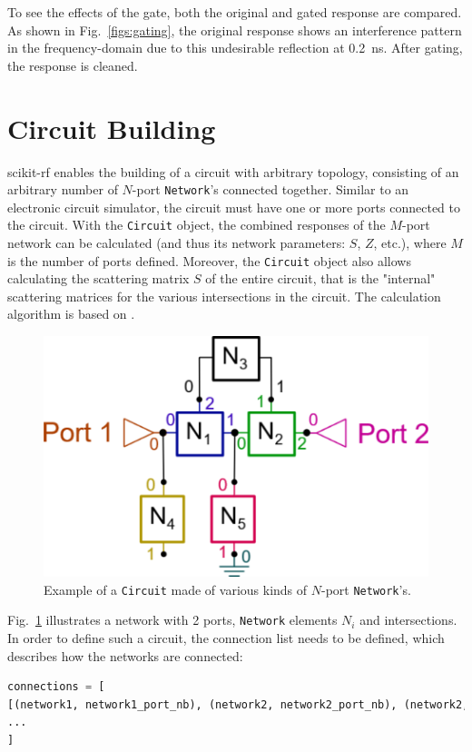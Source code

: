 \documentclass[10pt, letterpaper]{scrartcl}
\newcommand{\skrf}{{s}cikit-rf\xspace}
\begin{document}
To see the effects of the gate, both the original and gated response are compared. As shown in Fig.~\ref{figs:gating}, the original response shows an interference pattern in the frequency-domain due to this undesirable reflection at \SI{0.2}{\nano\second}. After gating, the response is cleaned.


\section{Circuit Building}
\skrf{} enables the building of a circuit with arbitrary topology, consisting of an arbitrary number of $N$-port \texttt{Network}'s connected together. Similar to an electronic circuit simulator, the circuit must have one or more ports connected to the circuit. With the \texttt{Circuit} object, the combined responses of the $M$-port network can be calculated (and thus its network parameters: $S$, $Z$, etc.), where $M$ is the number of ports defined. Moreover, the \texttt{Circuit} object also allows calculating the scattering matrix $S$ of the entire circuit, that is the "internal" scattering matrices for the various intersections in the circuit. The calculation algorithm is based on \cite{hallbjorner2003}.

\begin{figure}
	\centering
	\includegraphics[width=0.5\linewidth]{figures/circuit.png}
	\caption{ Example of a \texttt{Circuit} made of various kinds of $N$-port \texttt{Network}'s.}
	\label{fig:circuit}
\end{figure}

Fig.~\ref{fig:circuit} illustrates a network with 2 ports, \texttt{Network} elements $N_i$ and intersections. In order to define such a circuit, the connection list needs to be defined, which describes how the networks are connected:

\begin{lstlisting}[language=Python]
connections = [
[(network1, network1_port_nb), (network2, network2_port_nb), (network2, network2_port_nb), ...], 
...
]
\end{lstlisting}
\end{document}
